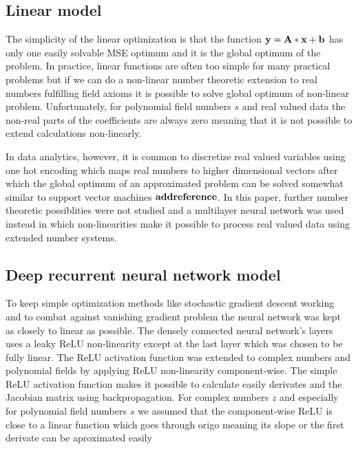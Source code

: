 \documentclass[preprint,12pt]{elsarticle}
\begin{document}
\subsection{Linear model}
\label{linearmodel}

The simplicity of the linear optimization is that the function $\bf{y} = \bf{A}*\bf{x} + \bf{b}$ has only one easily solvable MSE optimum and it is the global optimum of the problem. In practice, linear functions are often too simple for many practical problems but if we can do a non-linear number theoretic extension to real numbers fulfilling field axioms it is possible to solve global optimum of non-linear problem. Unfortunately, for polynomial field numbers $s$ and real valued data the non-real parts of the coefficients are always zero meaning that it is not possible to extend calculations non-linearly.

In data analytics, however, it is common to discretize real valued variables using one hot encoding which maps real numbers to higher dimensional vectors after which the global optimum of an approximated problem can be solved somewhat similar to support vector machines $\bf{add reference}$. In this paper, further number theoretic possiblities were not studied and a multilayer neural network was used instead in which non-linearities make it possible to process real valued data using extended number systems.

\subsection{Deep recurrent neural network model}
\label{neuralnetworkmodel}

To keep simple optimization methods like stochastic gradient descent working and to combat against vanishing gradient problem the neural network was kept as closely to linear as possible. The densely connected neural network's layers uses a leaky ReLU non-linearity \cite{reluarticle1, reluarticle2:2011:AISTATS} except at the last layer which was chosen to be fully linear. The ReLU activation function was extended to complex numbers and polynomial fields by applying ReLU non-linearity component-wise. The simple ReLU activation function makes it possible to calculate easily derivates and the Jacobian matrix using backpropagation. For complex numbers $z$ and especially for polynomial field numbers $s$ we assumed that the component-wise ReLU is close to a linear function which goes through origo meaning its slope or the first derivate can be aproximated easily 
\end{document}
